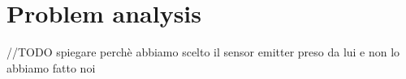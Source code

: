 \section{Problem analysis}
//TODO spiegare perchè abbiamo scelto il sensor emitter preso da lui e non lo abbiamo fatto noi


